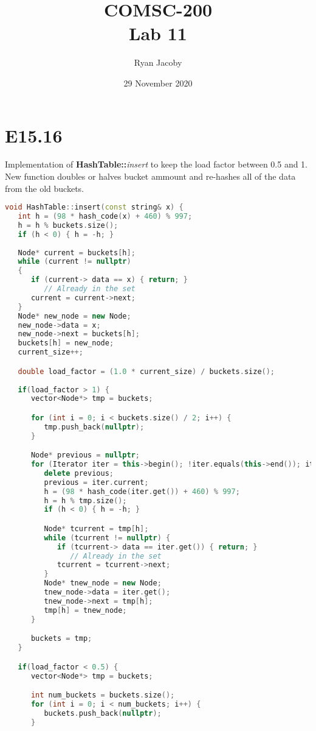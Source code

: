 \documentclass[letterpaper, 11pt]{article}
\title{COMSC-200 \\ Lab 11}
\author{Ryan Jacoby}
\date{29 November 2020}
\begin{document}
\maketitle

\section{E15.16}

Implementation of \textbf{HashTable::}\textit{insert} to keep the load factor between 0.5 and 1.  New function doubles or halves bucket ammount and re-hashes all of the data from the old buckets.

\begin{lstlisting}[language=c++, caption=HashTable::insert]
void HashTable::insert(const string& x) {
   int h = (98 * hash_code(x) + 460) % 997;
   h = h % buckets.size();
   if (h < 0) { h = -h; }
      
   Node* current = buckets[h];
   while (current != nullptr)
   {
      if (current-> data == x) { return; }
         // Already in the set
      current = current->next;
   }
   Node* new_node = new Node;
   new_node->data = x;
   new_node->next = buckets[h];
   buckets[h] = new_node;
   current_size++;

   double load_factor = (1.0 * current_size) / buckets.size();
   
   if(load_factor > 1) {
      vector<Node*> tmp = buckets;

      for (int i = 0; i < buckets.size() / 2; i++) {
         tmp.push_back(nullptr);
      }

      Node* previous = nullptr;
      for (Iterator iter = this->begin(); !iter.equals(this->end()); iter.next()) {
         delete previous;
         previous = iter.current;
         h = (98 * hash_code(iter.get()) + 460) % 997;
         h = h % tmp.size();
         if (h < 0) { h = -h; }

         Node* tcurrent = tmp[h];
         while (tcurrent != nullptr) {
            if (tcurrent-> data == iter.get()) { return; }
               // Already in the set
            tcurrent = tcurrent->next;
         }
         Node* tnew_node = new Node;
         tnew_node->data = iter.get();
         tnew_node->next = tmp[h];
         tmp[h] = tnew_node;
      }

      buckets = tmp;
   }

   if(load_factor < 0.5) {
      vector<Node*> tmp = buckets;

      int num_buckets = buckets.size();
      for (int i = 0; i < num_buckets; i++) {
         buckets.push_back(nullptr);
      }


\end{lstlisting}
\end{document}
